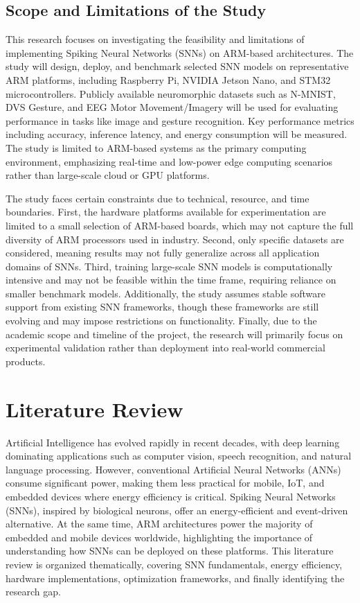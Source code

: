 \documentclass[a4paper,12pt]{article}
\begin{document}
	\subsection{Scope and Limitations of the Study}
	This research focuses on investigating the feasibility and limitations of implementing Spiking Neural Networks (SNNs) on ARM-based architectures. The study will design, deploy, and benchmark selected SNN models on representative ARM platforms, including Raspberry Pi, NVIDIA Jetson Nano, and STM32 microcontrollers. Publicly available neuromorphic datasets such as N-MNIST, DVS Gesture, and EEG Motor Movement/Imagery will be used for evaluating performance in tasks like image and gesture recognition. Key performance metrics including accuracy, inference latency, and energy consumption will be measured. The study is limited to ARM-based systems as the primary computing environment, emphasizing real-time and low-power edge computing scenarios rather than large-scale cloud or GPU platforms.
	
	The study faces certain constraints due to technical, resource, and time boundaries. First, the hardware platforms available for experimentation are limited to a small selection of ARM-based boards, which may not capture the full diversity of ARM processors used in industry. Second, only specific datasets are considered, meaning results may not fully generalize across all application domains of SNNs. Third, training large-scale SNN models is computationally intensive and may not be feasible within the time frame, requiring reliance on smaller benchmark models. Additionally, the study assumes stable software support from existing SNN frameworks, though these frameworks are still evolving and may impose restrictions on functionality. Finally, due to the academic scope and timeline of the project, the research will primarily focus on experimental validation rather than deployment into real-world commercial products.
	
	\section{Literature Review}
	Artificial Intelligence has evolved rapidly in recent decades, with deep learning dominating applications such as computer vision, speech recognition, and natural language processing. However, conventional Artificial Neural Networks (ANNs) consume significant power, making them less practical for mobile, IoT, and embedded devices where energy efficiency is critical. Spiking Neural Networks (SNNs), inspired by biological neurons, offer an energy-efficient and event-driven alternative. At the same time, ARM architectures power the majority of embedded and mobile devices worldwide, highlighting the importance of understanding how SNNs can be deployed on these platforms. This literature review is organized thematically, covering SNN fundamentals, energy efficiency, hardware implementations, optimization frameworks, and finally identifying the research gap.
	
\end{document}
